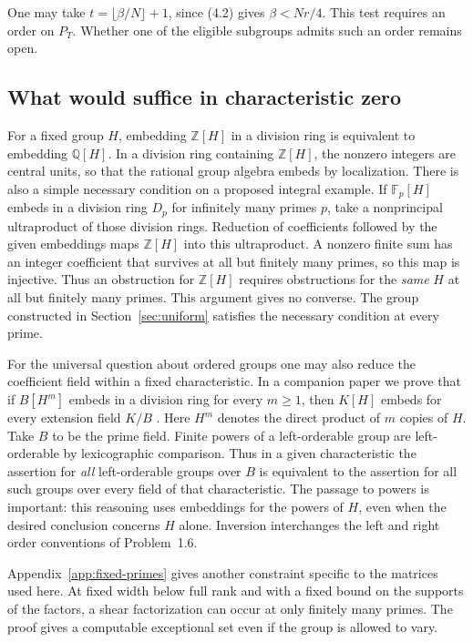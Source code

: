 \documentclass[11pt,a4paper]{article}
\numberwithin{equation}{section}
\newcommand{\F}{\mathbb F}
\newcommand{\Z}{\mathbb Z}
\newcommand{\Q}{\mathbb Q}
\begin{document}
One may take \(t=\lfloor\beta/N\rfloor+1\), since (4.2) gives \(\beta<Nr/4\). This test requires an order on \(P_T\). Whether one of the eligible subgroups admits such an order remains open.

\subsection{What would suffice in characteristic zero}

For a fixed group \(H\), embedding \(\Z[H]\) in a division ring is equivalent to embedding \(\Q[H]\). In a division ring containing \(\Z[H]\), the nonzero integers are central units, so that the rational group algebra embeds by localization. There is also a simple necessary condition on a proposed integral example. If \(\F_p[H]\) embeds in a division ring \(D_p\) for infinitely many primes \(p\), take a nonprincipal ultraproduct of those division rings. Reduction of coefficients followed by the given embeddings maps \(\Z[H]\) into this ultraproduct. A nonzero finite sum has an integer coefficient that survives at all but finitely many primes, so this map is injective. Thus an obstruction for \(\Z[H]\) requires obstructions for the \emph{same} \(H\) at all but finitely many primes. This argument gives no converse. The group constructed in Section~\ref{sec:uniform} satisfies the necessary condition at every prime.

For the universal question about ordered groups one may also reduce the coefficient field within a fixed characteristic. In a companion paper we prove that if \(B[H^m]\) embeds in a division ring for every \(m\ge1\), then \(K[H]\) embeds for every extension field \(K/B\) \cite[Theorem~1.1]{EmbeddingCoeff}. Here \(H^m\) denotes the direct product of \(m\) copies of \(H\). Take \(B\) to be the prime field. Finite powers of a left-orderable group are left-orderable by lexicographic comparison. Thus in a given characteristic the assertion for \emph{all} left-orderable groups over \(B\) is equivalent to the assertion for all such groups over every field of that characteristic. The passage to powers is important: this reasoning uses embeddings for the powers of \(H\), even when the desired conclusion concerns \(H\) alone. Inversion interchanges the left and right order conventions of Problem~1.6.

Appendix~\ref{app:fixed-primes} gives another constraint specific to the matrices used here. At fixed width below full rank and with a fixed bound on the supports of the factors, a shear factorization can occur at only finitely many primes. The proof gives a computable exceptional set even if the group is allowed to vary.
\end{document}

